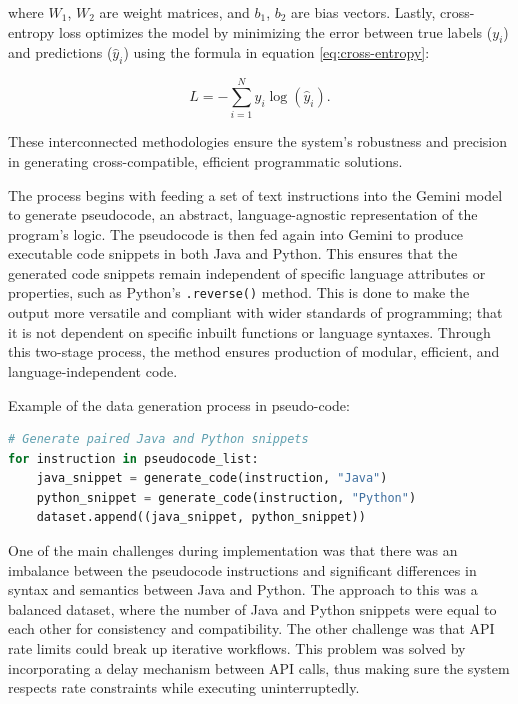 \documentclass{dhbenelux}
\begin{document}
where \( W_1 \), \( W_2 \) are weight matrices, and \( b_1 \), \( b_2 \) are bias vectors. Lastly, cross-entropy loss optimizes the model by minimizing the error between true labels (\( y_i \)) and predictions (\( \hat{y}_i \)) using the formula in equation \ref{eq:cross-entropy}:

\begin{equation}
L = -\sum_{i=1}^N y_i \log(\hat{y}_i).
\label{eq:cross-entropy}
\end{equation}

These interconnected methodologies ensure the system’s robustness and precision in generating cross-compatible, efficient programmatic solutions.


The process begins with feeding a set of text instructions into the Gemini model to generate pseudocode, an abstract, language-agnostic representation of the program's logic. The pseudocode is then fed again into Gemini to produce executable code snippets in both Java and Python. This ensures that the generated code snippets remain independent of specific language attributes or properties, such as Python's \texttt{.reverse()} method. This is done to make the output more versatile and compliant with wider standards of programming; that it is not dependent on specific inbuilt functions or language syntaxes. Through this two-stage process, the method ensures production of modular, efficient, and language-independent code.

\noindent Example of the data generation process in pseudo-code:
\begin{lstlisting}[language=Python, caption={Pseudocode for Dataset Preparation}]
# Generate paired Java and Python snippets
for instruction in pseudocode_list:
    java_snippet = generate_code(instruction, "Java")
    python_snippet = generate_code(instruction, "Python")
    dataset.append((java_snippet, python_snippet))
\end{lstlisting}

One of the main challenges during implementation was that there was an imbalance between the pseudocode instructions and significant differences in syntax and semantics between Java and Python. The approach to this was a balanced dataset, where the number of Java and Python snippets were equal to each other for consistency and compatibility. The other challenge was that API rate limits could break up iterative workflows. This problem was solved by incorporating a delay mechanism between API calls, thus making sure the system respects rate constraints while executing uninterruptedly.
\end{document}

